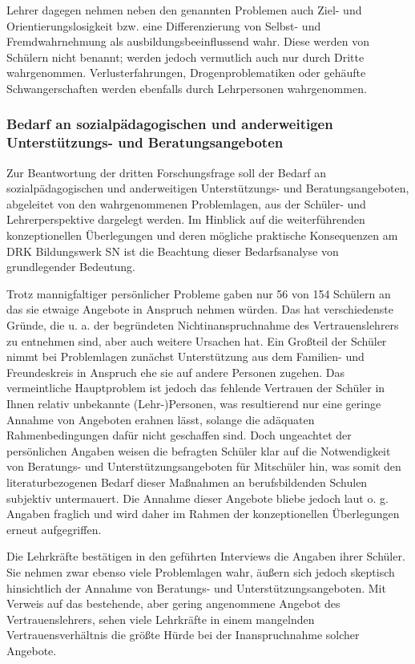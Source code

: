 Lehrer dagegen nehmen neben den genannten Problemen auch Ziel- und Orientierungslosigkeit bzw. eine Differenzierung von Selbst- und Fremdwahrnehmung als ausbildungsbeeinflussend wahr. Diese werden von Schülern nicht benannt; werden jedoch vermutlich auch nur durch Dritte wahrgenommen. Verlusterfahrungen, Drogenproblematiken oder gehäufte Schwangerschaften werden ebenfalls durch Lehrpersonen wahrgenommen.\\

\subsubsection{Bedarf an sozialpädagogischen und anderweitigen Unterstützungs- und Beratungsangeboten}
\label{sec:BedarfAnSozialpädagogischenUndAnderweitigenUnterstützungsUndBeratungsangeboten}

Zur Beantwortung der dritten Forschungsfrage soll der Bedarf an sozialpädagogischen und anderweitigen Unterstützungs- und Beratungsangeboten, abgeleitet von den wahrgenommenen Problemlagen, aus der Schüler- und Lehrerperspektive dargelegt werden. Im Hinblick auf die weiterführenden konzeptionellen Überlegungen und deren mögliche praktische Konsequenzen am DRK Bildungswerk SN ist die Beachtung dieser Bedarfsanalyse von grundlegender Bedeutung. 

Trotz mannigfaltiger persönlicher Probleme gaben nur 56 von 154 Schülern an das sie etwaige Angebote in Anspruch nehmen würden. Das hat verschiedenste Gründe, die u. a. der begründeten Nichtinanspruchnahme des Vertrauenslehrers zu entnehmen sind, aber auch weitere Ursachen hat. Ein Großteil der Schüler nimmt bei Problemlagen zunächst Unterstützung aus dem Familien- und Freundeskreis in Anspruch ehe sie auf andere Personen zugehen. Das vermeintliche Hauptproblem ist jedoch das fehlende Vertrauen der Schüler in Ihnen relativ unbekannte (Lehr-)Personen, was resultierend nur eine geringe Annahme von Angeboten erahnen lässt, solange die adäquaten Rahmenbedingungen dafür nicht geschaffen sind. Doch ungeachtet der persönlichen Angaben weisen die befragten Schüler klar auf die Notwendigkeit von Beratungs- und Unterstützungsangeboten für Mitschüler hin, was somit den literaturbezogenen Bedarf dieser Maßnahmen an berufsbildenden Schulen subjektiv untermauert. Die Annahme dieser Angebote bliebe jedoch laut o. g. Angaben fraglich und wird daher im Rahmen der konzeptionellen Überlegungen erneut aufgegriffen.

Die Lehrkräfte bestätigen in den geführten Interviews die Angaben ihrer Schüler. Sie nehmen zwar ebenso viele Problemlagen wahr, äußern sich jedoch skeptisch hinsichtlich der Annahme von Beratungs- und Unterstützungsangeboten. Mit Verweis auf das bestehende, aber gering angenommene Angebot des Vertrauenslehrers, sehen viele Lehrkräfte in einem mangelnden Vertrauensverhältnis die größte Hürde bei der Inanspruchnahme solcher Angebote. 


